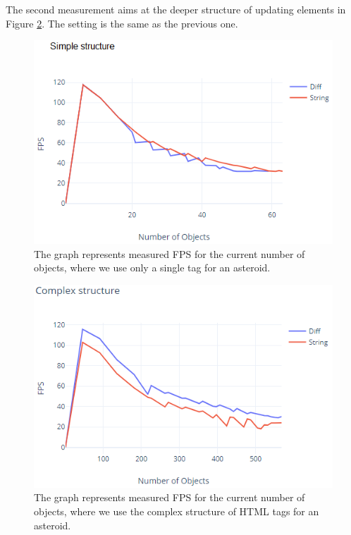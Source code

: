 The second measurement aims at the deeper structure of updating elements in Figure \ref{img32:benchmark2}.
The setting is the same as the previous one.
\par
\begin{figure}
\centering
\includegraphics{./img/graph_1}
\caption{The graph represents measured FPS for the current number of objects, where we use only a single tag for an asteroid.}
\label{img31:benchmark1}
\end{figure} 
\par
\begin{figure}
\centering
\includegraphics{./img/graph_3}
\caption{The graph represents measured FPS for the current number of objects, where we use the complex structure of HTML tags for an asteroid.}
\label{img32:benchmark2}
\end{figure} 
\par
